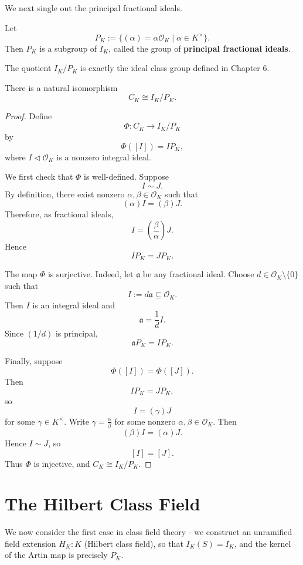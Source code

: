 We next single out the principal fractional ideals.

\begin{definition}
Let
\[
P_K:=\{(\alpha)=\alpha\mathcal O_K\mid \alpha\in K^\times\}.
\]
Then $P_K$ is a subgroup of $I_K$, called the group of {\bf principal fractional ideals}.
\end{definition}

The quotient $I_K/P_K$ is exactly the ideal class group defined in Chapter 6.

\begin{proposition}\label{prop-classgroup-fractional}
There is a natural isomorphism
\[
\boxed{
C_K\cong I_K/P_K.
}
\]
\end{proposition}

\begin{proof}
Define
\[
\Phi:C_K\longrightarrow I_K/P_K
\]
by
\[
\Phi([I])=I P_K,
\]
where $I\lhd\mathcal O_K$ is a nonzero integral ideal.

We first check that $\Phi$ is well-defined. Suppose
\[
I\sim J.
\]
By definition, there exist nonzero $\alpha,\beta\in\mathcal O_K$ such that
\[
(\alpha)I=(\beta)J.
\]
Therefore, as fractional ideals,
\[
I=\left(\frac{\beta}{\alpha}\right)J.
\]
Hence
\[
IP_K=JP_K.
\]

The map $\Phi$ is surjective. Indeed, let $\mathfrak a$ be any fractional ideal. Choose
$d\in\mathcal O_K\setminus\{0\}$ such that
\[
I:=d\mathfrak a\subseteq\mathcal O_K.
\]
Then $I$ is an integral ideal and
\[
\mathfrak a=\frac1d I.
\]
Since $(1/d)$ is principal,
\[
\mathfrak a P_K=IP_K.
\]

Finally, suppose
\[
\Phi([I])=\Phi([J]).
\]
Then
\[
IP_K=JP_K,
\]
so
\[
I=(\gamma)J
\]
for some $\gamma\in K^\times$. Write
\(\gamma=\frac{\alpha}{\beta}
\)
for some nonzero $\alpha,\beta\in\mathcal O_K$. Then
\[
(\beta)I=(\alpha)J.
\]
Hence $I\sim J$, so
\[
[I]=[J].
\]
Thus $\Phi$ is injective, and 
\(C_K\cong I_K/P_K.
\)
\end{proof}



\section{The Hilbert Class Field}
We now consider the first case in class field theory - we construct an unramified field extension $H_K : K$ (Hilbert class field), so that $I_K(S) = I_K$, and the kernel of the Artin map is precisely $P_K$. 

